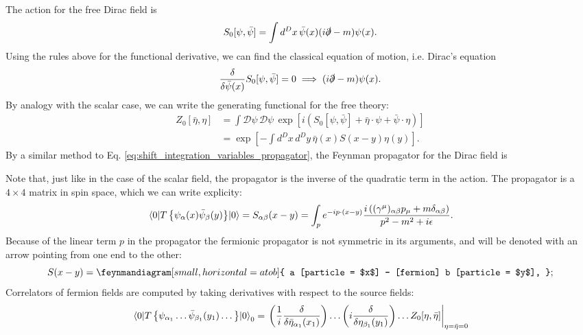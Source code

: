 \documentclass{article}
\numberwithin{equation}{section}
\newcommand*\widefbox[1]{\fbox{\hspace{2em}#1\hspace{2em}}}
\begin{document}
The action for the free Dirac field is 
\begin{equation}
    S_0[\psi, \bar{\psi}] = \int d^Dx \, \bar{\psi}(x) (i\slashed{\partial} - m)\psi(x).
\end{equation}
Using the rules above for the functional derivative, we can find the classical equation of motion, i.e. Dirac's equation
\begin{equation}
    \fdv{\bar{\psi}(x)} S_0[\psi, \bar{\psi}] = 0 \implies (i\slashed{\partial} - m)\psi(x).
\end{equation}
By analogy with the scalar case, we can write the generating functional for the free theory:
\begin{equation}
\begin{aligned}
    Z_0[\bar{\eta}, \eta] &= \int \mathcal{D} \psi \, \mathcal{D} \psi \,\exp\left[i (S_0[\psi, \bar{\psi}] + \bar{\eta} \cdot \psi + \bar{\psi} \cdot \eta)\right] \\
    &= \exp\left[-\int d^Dx \, d^Dy \, \bar{\eta}(x) S(x-y) \eta(y)\right].
\end{aligned}
\end{equation}
By a similar method to Eq. \ref{eq:shift_integration_variables_propagator}, the Feynman propagator for the Dirac field is
Note that, just like in the case of the scalar field, the propagator is the inverse of the quadratic term in the action. The propagator is a $4 \times 4$ matrix in spin space, which we can write explicity:
\begin{equation}
    \ev{T\left\{\psi_\alpha(x)\bar{\psi}_\beta(y)\right\}}{0} = S_{\alpha\beta}(x-y) = \int_p e^{-ip \cdot (x-y)} \frac{i\left((\gamma^\mu)_{\alpha\beta}p_\mu + m \delta_{\alpha\beta}\right)}{p^2-m^2+i\epsilon}.
\end{equation}
Because of the linear term $p$ in the propagator the fermionic propagator is not symmetric in its arguments, and will be denoted with an arrow pointing from one end to the other: 
\begin{equation}
    S(x-y) = \feynmandiagram[small, horizontal=a to b]{
        a [particle = $x$] -- [fermion] b [particle = $y$],
    };
\end{equation} %
Correlators of fermion fields are computed by taking derivatives with respect to the source fields:
\begin{equation}
    \ev{T\left\{\psi_{\alpha_1} \dots \bar{\psi}_{\beta_1}(y_1) \dots \right\}}{0}_0 = \eval{\left(\frac{1}{i}\fdv{\bar{\eta}_{\alpha_1}(x_1)}\right) \dots \left(i \fdv{\eta_{\beta_1}(y_1)}\right) \dots Z_0[\eta, \bar{\eta}]}_{\eta = \bar{\eta} = 0}
\end{equation}%
\end{document}
